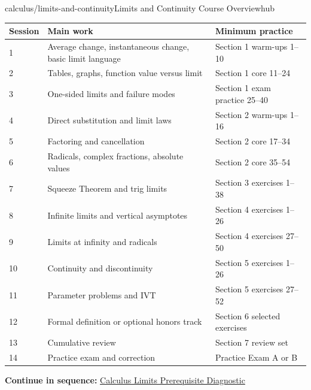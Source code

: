 \documentclass[11pt,openany]{book}
\theoremstyle{bgplain}
\newcommand{\webnext}[2]{%
  \par\addvspace{1.2em}\noindent{\color{BGLine}\rule{\textwidth}{0.35pt}}\par\smallskip
  {\small\color{BGGray}\textbf{Continue in sequence:} \hyperlink{web:#1}{#2}}\par
}
\begin{document}
\begin{webpage}{calculus/limits-and-continuity}{Limits and Continuity Course Overview}{hub}
\begin{center}
\begin{tabularx}{\textwidth}{@{}p{}X X@{}}
\toprule
\textbf{Session} & \textbf{Main work} & \textbf{Minimum practice}\\
\midrule
1 & Average change, instantaneous change, basic limit language & Section 1 warm-ups 1--10\\
2 & Tables, graphs, function value versus limit & Section 1 core 11--24\\
3 & One-sided limits and failure modes & Section 1 exam practice 25--40\\
4 & Direct substitution and limit laws & Section 2 warm-ups 1--16\\
5 & Factoring and cancellation & Section 2 core 17--34\\
6 & Radicals, complex fractions, absolute values & Section 2 core 35--54\\
7 & Squeeze Theorem and trig limits & Section 3 exercises 1--38\\
8 & Infinite limits and vertical asymptotes & Section 4 exercises 1--26\\
9 & Limits at infinity and radicals & Section 4 exercises 27--50\\
10 & Continuity and discontinuity & Section 5 exercises 1--26\\
11 & Parameter problems and IVT & Section 5 exercises 27--52\\
12 & Formal definition or optional honors track & Section 6 selected exercises\\
13 & Cumulative review & Section 7 review set\\
14 & Practice exam and correction & Practice Exam A or B\\
\bottomrule
\end{tabularx}
\end{center}
\webnext{calculus/limits/prerequisite-diagnostic}{Calculus Limits Prerequisite Diagnostic}
\end{webpage}
\end{document}
